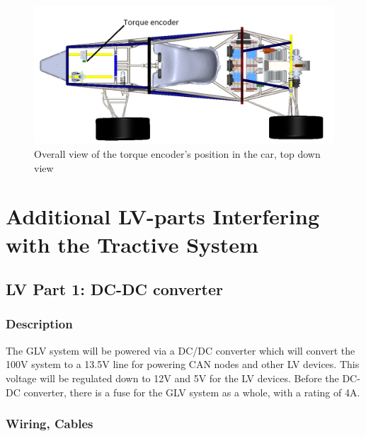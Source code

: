 \documentclass{article}
\begin{document}
        \begin{figure}[H]
            \centering
            \includegraphics[width = 0.7 \textwidth]{torquefullcar}
            \caption{Overall view of the torque encoder's position in the car, top down view}
            \label{torquetopdown}
        \end{figure}

\newpage

\section{Additional LV-parts Interfering with the Tractive System}

    \subsection{LV Part 1: DC-DC converter}

        \subsubsection{Description}

            The GLV system will be powered via a DC/DC converter which will convert the 100V system to a 13.5V line for powering CAN nodes and other LV devices. This voltage will be regulated down to 12V and 5V for the LV devices. Before the DC-DC converter, there is a fuse for the GLV system as a whole, with a rating of 4A. 

        \subsubsection{Wiring, Cables}
\end{document}

